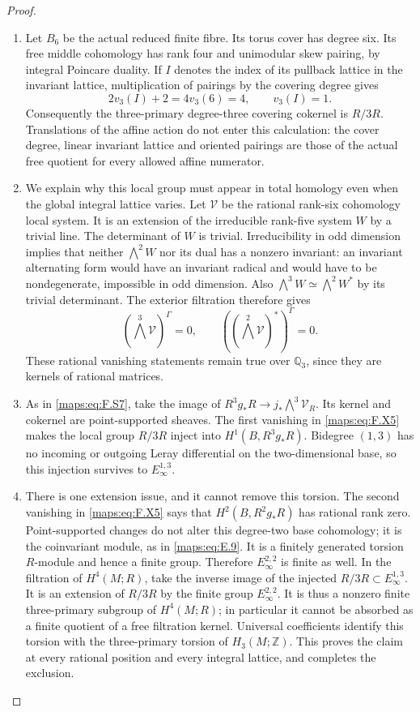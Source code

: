 \documentclass[11pt,a4paper]{article}
\theoremstyle{definition}
\begin{document}
\begin{proof}
\begin{enumerate}[label=\arabic*.]
\item Let $B_6$ be the actual reduced finite fibre.  Its torus
cover has degree six.  Its free middle cohomology has
rank four and unimodular skew pairing, by integral
Poincare duality.  If $I$ denotes the index of its
pullback lattice in the invariant lattice, multiplication
of pairings by the covering degree gives
\[
 2v_3(I)+2=4v_3(6)=4,
 \qquad v_3(I)=1.
 \tag{F.X4}\label{maps:eq:F.X4}
\]
Consequently the three-primary degree-three covering
cokernel is $R/3R$.  Translations of the affine action
do not enter this calculation: the cover degree,
linear invariant lattice and oriented pairings are
those of the actual free quotient for every allowed
affine numerator.

\item We explain why this local group must appear in total
homology even when the global integral lattice varies.
Let $\mathcal V$ be the rational rank-six cohomology
local system.  It is an extension of the irreducible
rank-five system $W$ by a trivial line.  The determinant
of $W$ is trivial.  Irreducibility in odd dimension
implies that neither $\bigwedge^2 W$ nor its dual
has a nonzero invariant: an invariant alternating
form would have an invariant radical and would have
to be nondegenerate, impossible in odd dimension.
Also $\bigwedge^3W\simeq\bigwedge^2W^*$ by its
trivial determinant.  The exterior filtration therefore
gives
\[
 (\bigwedge^3\mathcal V)^\Gamma=0,\qquad
 ((\bigwedge^2\mathcal V)^*)^\Gamma=0.
 \tag{F.X5}\label{maps:eq:F.X5}
\]
These rational vanishing statements remain true over
$\mathbb Q_3$, since they are kernels of rational
matrices.

\item As in \eqref{maps:eq:F.S7}, take the image of
$R^3g_*R\to j_*\bigwedge^3\mathcal V_R$.
Its kernel and cokernel are point-supported sheaves.
The first vanishing in \eqref{maps:eq:F.X5} makes the local group
$R/3R$ inject into $H^1(B,R^3g_*R)$.  Bidegree $(1,3)$
has no incoming or outgoing Leray differential on
the two-dimensional base, so this injection survives
to $E_\infty^{1,3}$.

\item There is one extension issue, and it cannot remove
this torsion.  The second vanishing in \eqref{maps:eq:F.X5} says
that $H^2(B,R^2g_*R)$ has rational rank zero.
Point-supported changes do not alter this degree-two
base cohomology; it is the coinvariant module, as
in \eqref{maps:eq:E.9}.  It is a finitely generated torsion $R$-module
and hence a finite group.  Therefore
$E_\infty^{2,2}$ is finite as well.  In the filtration
of $H^4(M;R)$, take the inverse image of the injected
$R/3R\subset E_\infty^{1,3}$.  It is an extension
of $R/3R$ by the finite group $E_\infty^{2,2}$.
It is thus a nonzero finite three-primary subgroup
of $H^4(M;R)$; in particular it cannot be absorbed
as a finite quotient of a free filtration kernel.
Universal coefficients identify this torsion with
the three-primary torsion of $H_3(M;\mathbb Z)$.
This proves the claim at every rational position and
every integral lattice, and completes the exclusion.

\end{enumerate}
\end{proof}
\end{document}
